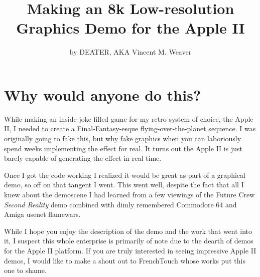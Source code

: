 \documentclass[twocolumn]{article}
\begin{document}
\title{Making an 8k Low-resolution Graphics Demo for the Apple II}
\author{by DEATER, AKA Vincent M. Weaver}
\date{}
\maketitle

\section{Why would anyone do this?}

While making an inside-joke filled game for my retro system of choice,
the Apple II, I needed to create a Final-Fantasy-esque
flying-over-the-planet sequence.
I was originally going to fake this, but why fake graphics when you
can laboriously spend weeks implementing the effect for real.
It turns out the Apple II is just barely capable of generating
the effect in real time.

Once I got the code working I realized it would be great as part of a
graphical demo, so off on that tangent I went.
This went well, despite the fact that all I knew about the demoscene I
had learned from a few viewings of the Future Crew {\em Second Reality} demo
combined with dimly remembered Commodore 64 and Amiga usenet flamewars.



While I hope you enjoy the description of the demo and the work that
went into it, I suspect this whole enterprise is primarily of note
due to the dearth of demos for the Apple II platform.
If you are truly interested in seeing impressive Apple II demos, 
I would like to make a shout out to FrenchTouch whose works
put this one to shame.


\end{document}
